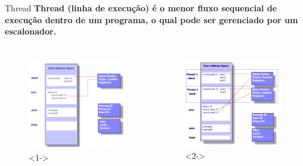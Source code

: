 \documentclass[10pt, xcolor=x11names]{beamer}
\begin{document}
\begin{frame}
	\begin{alertblock}{Thread}
		\textbf{Thread (linha de execução) é o menor fluxo sequencial de execução dentro de um programa, o qual pode ser gerenciado por um escalonador.}
	\end{alertblock}
	\begin{columns}
		\begin{figure}
		\centering
			\includegraphics[width=.8\linewidth]{img/process}<1->
		\end{figure}

		\begin{figure}
		\centering
			\includegraphics[width=.8\linewidth]{img/thread.png}<2->
		\end{figure}
	\end{columns}

\end{frame}
\end{document}
